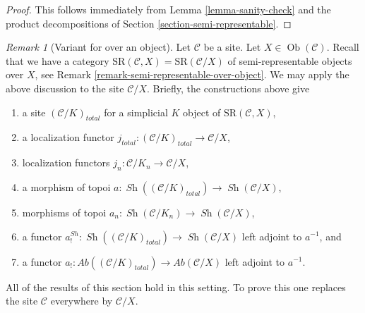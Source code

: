\documentclass{stacks-project}
\theoremstyle{plain}
\theoremstyle{definition}
\theoremstyle{remark}
\newtheorem{remark}[subsection]{Remark}
\numberwithin{equation}{subsection}
\def\Ob{\mathop{\mathrm{Ob}}\nolimits}
\def\Sh{\mathop{\mathit{Sh}}\nolimits}
\begin{document}
\begin{proof}
This follows immediately from Lemma \ref{lemma-sanity-check}
and the product decompositions of Section \ref{section-semi-representable}.
\end{proof}

\begin{remark}[Variant for over an object]
\label{remark-augmentation-over-object}
Let $\mathcal{C}$ be a site. Let $X \in \Ob(\mathcal{C})$.
Recall that we have a category
$\text{SR}(\mathcal{C}, X) = \text{SR}(\mathcal{C}/X)$
of semi-representable objects over $X$,
see Remark \ref{remark-semi-representable-over-object}.
We may apply the above discussion to the site
$\mathcal{C}/X$. Briefly, the constructions above give
\begin{enumerate}
\item a site $(\mathcal{C}/K)_{total}$ for a simplicial $K$ object
of $\text{SR}(\mathcal{C}, X)$,
\item a localization functor
$j_{total} : (\mathcal{C}/K)_{total} \to \mathcal{C}/X$,
\item localization functors $j_n : \mathcal{C}/K_n \to \mathcal{C}/X$,
\item a morphism of topoi
$a : \Sh((\mathcal{C}/K)_{total}) \to \Sh(\mathcal{C}/X)$,
\item morphisms of topoi
$a_n : \Sh(\mathcal{C}/K_n) \to \Sh(\mathcal{C}/X)$,
\item a functor
$a^{Sh}_! : \Sh((\mathcal{C}/K)_{total}) \to \Sh(\mathcal{C}/X)$
left adjoint to $a^{-1}$, and
\item a functor
$a_! : \textit{Ab}((\mathcal{C}/K)_{total}) \to \textit{Ab}(\mathcal{C}/X)$
left adjoint to $a^{-1}$.
\end{enumerate}
All of the results of this section hold in this setting.
To prove this one replaces
the site $\mathcal{C}$ everywhere by $\mathcal{C}/X$.
\end{remark}
\end{document}
